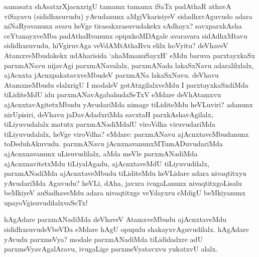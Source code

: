
\begin{artha}
samasatx shAsatxrXjacnxrigU tamamx tamamx iSaTx padAthaR athavA viSayavu (sididhxsuvudu) yAvudanunx aMgiVkarisiyeV sidadhxvAguvudo adara niNaRyavanunx avaru heVge tirasakxrasuvudakekx sAdhayx? savxparxkAsha ceYtanayxveMba padAthaRvanunx opipxkoMDAgale avaravara sidAdhxMtavu sididhxsuvudu, hiVgiruvAga veVdAMtAthaRvu elilx hoVyitu? deVhaveV AtamxveMbudakekx udAharisida `ahaMmanuSayxH' eMdu baruva parxtayxkaSx parxmANavu nijavAgi parxmANavalalx, parxmANada lakaSxNavu adaralilxlalx, ajAcnxta jAcnxpakatavxveMbudeV parxmANa lakaSxNavu. deVhavu AtamxneMbudu elalxrigU I modaleV gotAtxgilalxveMdu I parxtayxkaSxdiMda tiLiditeMdU idu parxmANavAgabahudaSeTxV eMdare deVhAtamxvu ajAcnxtavAgitetxMbudu yAvudariMda nimage tiLiditeMdu heVLuviri? adanunx nirUpisiri, deVhavu jaDavAdadxriMda savxtaH parxkAshavAgilalx, tiLiyuvudalalx matutx parxmANadiMdalU viroVdha viruvudariMda tiLiyuvudalalx, heVge viroVdha? eMdare: parxmANavu ajAcnxtaveMbudanunx toDeduhAkuvudu. parxmANavu jAcnxnavanunxMTumADuvudariMda ajAcnxnavanunx uLisuvudilalx, aMda meVle parxmANadiMda ajAcnxnavitetxMdu tiLiyalAgadu, ajAcnxtaveMdU tiLiyuvudilalx, parxmANadiMda ajAcnxtaveMbudu tiLiditeMdu heVLidare adara nivaqtitxyu yAvudariMda Aguvudu? heVLi, dAha, javxra ivugaLanunx nivaqtitxgoLisalu beMkiyeV auSadhaveMdu adara nivaqtitxge veYdayxru eMdigU beMkiyanunx upayoVgisuvudilalxvaSeTx!
\end{artha}

\begin{artha}
hAgAdare parxmANadiMda deVhaveV AtamxveMbudu ajAcnxtaveMdu sididhxsuvudeVbeVDa eMdare hAgU opupxlu shakayxvAguvudilalx. hAgAdare yAvudu parxmeVya? modale parxmANadiMda tiLididadxre adU parxmeVyavAgalAravu, ivugaLige parxmeVyatavxvu yukatxvU alalx.
\end{artha}

